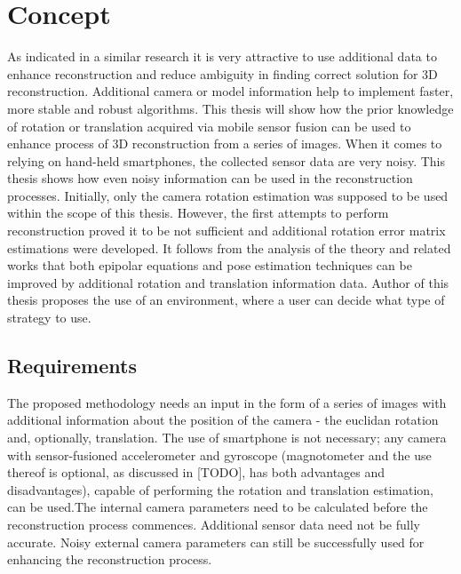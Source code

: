 
\chapter{Concept} %
As indicated in a similar research it is very attractive to use additional data to enhance reconstruction and reduce ambiguity in finding correct solution for 3D reconstruction. Additional camera or model information help to implement faster, more stable and robust algorithms. This thesis will show how the prior knowledge of rotation or translation acquired via mobile sensor fusion can be used to enhance process of 3D reconstruction from a series of images. When it comes to relying on hand-held smartphones, the collected sensor data are very noisy. This thesis shows how even noisy information can be used in the reconstruction processes. Initially, only the camera rotation estimation was supposed to be used within the scope of this thesis. However, the first attempts to perform reconstruction proved it to be not sufficient and additional rotation error matrix estimations were developed.
It follows from the analysis of the theory and related works that both epipolar equations and pose estimation techniques can be improved by additional rotation and translation information data.  Author of this thesis proposes the use of an environment, where a user can decide what type of strategy to use.
\section{Requirements}
The proposed methodology needs an input in the form of a series of images with additional information about the position of the camera - the euclidan rotation and, optionally, translation. The use of smartphone is not necessary; any camera with sensor-fusioned accelerometer and gyroscope (magnotometer and the use thereof is optional, as discussed in [TODO], has both advantages and disadvantages), capable of performing the rotation and translation estimation, can be used.The internal camera parameters need to be calculated before the reconstruction process commences. Additional sensor data need not be fully accurate. Noisy external camera parameters can still be successfully used for enhancing the reconstruction process.
